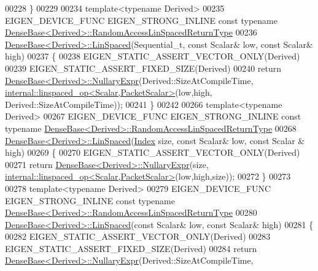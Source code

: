 \begin{DoxyCode}
00228 \}
00229 
00234 \textcolor{keyword}{template}<\textcolor{keyword}{typename} Derived>
00235 EIGEN\_DEVICE\_FUNC EIGEN\_STRONG\_INLINE \textcolor{keyword}{const} \textcolor{keyword}{typename} 
      \hyperlink{group___core___module_class_eigen_1_1_cwise_nullary_op}{DenseBase<Derived>::RandomAccessLinSpacedReturnType}
00236 \hyperlink{group___core___module_a35f222d8834f34fd358f2ef7bb52c888}{DenseBase<Derived>::LinSpaced}(Sequential\_t, \textcolor{keyword}{const} Scalar& low, \textcolor{keyword}{const} Scalar& 
      high)
00237 \{
00238   EIGEN\_STATIC\_ASSERT\_VECTOR\_ONLY(Derived)
00239   EIGEN\_STATIC\_ASSERT\_FIXED\_SIZE(Derived)
00240   \textcolor{keywordflow}{return} \hyperlink{group___core___module_class_eigen_1_1_dense_base}{DenseBase<Derived>::NullaryExpr}(Derived::SizeAtCompileTime, 
      \hyperlink{struct_eigen_1_1internal_1_1linspaced__op}{internal::linspaced\_op<Scalar,PacketScalar>}(low,high,
      Derived::SizeAtCompileTime));
00241 \}
00242 
00266 \textcolor{keyword}{template}<\textcolor{keyword}{typename} Derived>
00267 EIGEN\_DEVICE\_FUNC EIGEN\_STRONG\_INLINE \textcolor{keyword}{const} \textcolor{keyword}{typename} 
      \hyperlink{group___core___module_class_eigen_1_1_cwise_nullary_op}{DenseBase<Derived>::RandomAccessLinSpacedReturnType}
00268 \hyperlink{group___core___module_a35f222d8834f34fd358f2ef7bb52c888}{DenseBase<Derived>::LinSpaced}(\hyperlink{namespace_eigen_a62e77e0933482dafde8fe197d9a2cfde}{Index} size, \textcolor{keyword}{const} Scalar& low, \textcolor{keyword}{const} Scalar
      & high)
00269 \{
00270   EIGEN\_STATIC\_ASSERT\_VECTOR\_ONLY(Derived)
00271   \textcolor{keywordflow}{return} \hyperlink{group___core___module_class_eigen_1_1_dense_base}{DenseBase<Derived>::NullaryExpr}(size, 
      \hyperlink{struct_eigen_1_1internal_1_1linspaced__op}{internal::linspaced\_op<Scalar,PacketScalar>}(low,high,size));
00272 \}
00273 
00278 \textcolor{keyword}{template}<\textcolor{keyword}{typename} Derived>
00279 EIGEN\_DEVICE\_FUNC EIGEN\_STRONG\_INLINE \textcolor{keyword}{const} \textcolor{keyword}{typename} 
      \hyperlink{group___core___module_class_eigen_1_1_cwise_nullary_op}{DenseBase<Derived>::RandomAccessLinSpacedReturnType}
00280 \hyperlink{group___core___module_a35f222d8834f34fd358f2ef7bb52c888}{DenseBase<Derived>::LinSpaced}(\textcolor{keyword}{const} Scalar& low, \textcolor{keyword}{const} Scalar& high)
00281 \{
00282   EIGEN\_STATIC\_ASSERT\_VECTOR\_ONLY(Derived)
00283   EIGEN\_STATIC\_ASSERT\_FIXED\_SIZE(Derived)
00284   \textcolor{keywordflow}{return} \hyperlink{group___core___module_class_eigen_1_1_dense_base}{DenseBase<Derived>::NullaryExpr}(Derived::SizeAtCompileTime, 

\end{DoxyCode}
